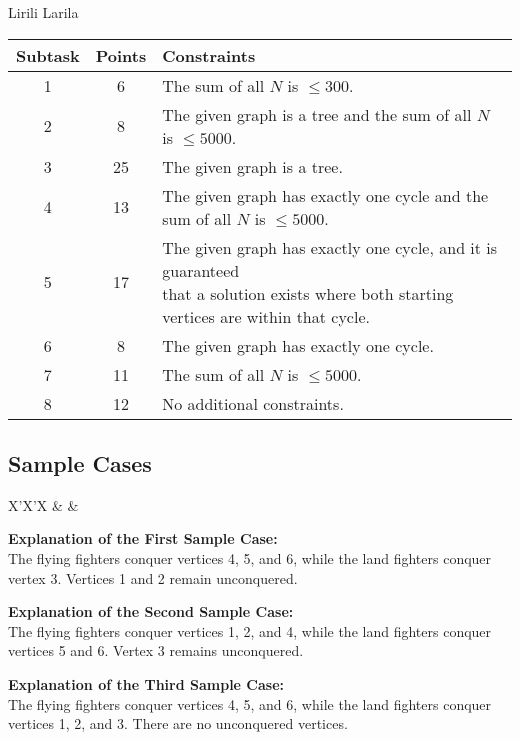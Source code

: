 \begin{statement}[
  problempoints=100,
  timelimit=2 seconds,
  memorylimit=512 MiB,
]{Lirili Larila}
{\renewcommand{\arraystretch}{1.4}
  \setlength{\tabcolsep}{6pt}
  \begin{tabular}{ccl}
   Subtask & Points & Constraints \\ \midrule
    1 & 6 & The sum of all $N$ is $\leq 300$. \\
    2 & 8 & The given graph is a tree and the sum of all $N$ is $\leq 5000$. \\
    3 & 25 & The given graph is a tree. \\
    4 & 13 & The given graph has exactly one cycle and the sum of all $N$ is $\leq 5000$. \\[5pt]
    5 & 17 & \makecell[l]{The given graph has exactly one cycle, and it is guaranteed \\ that a solution exists where both starting vertices are within that cycle.} \\[6pt]
    6 & 8 & The given graph has exactly one cycle. \\
    7 & 11 & The sum of all $N$ is $\leq 5000$. \\
    8 & 12 & No additional constraints. \\
\end{tabular}}

\subsection*{Sample Cases}
\begin{tabularx}{\textwidth}{X'X'X}
 &
 &
\end{tabularx}

\textbf{Explanation of the First Sample Case:} \\
The flying fighters conquer vertices 4, 5, and 6, while the land fighters conquer vertex 3.  
Vertices 1 and 2 remain unconquered.

\textbf{Explanation of the Second Sample Case:} \\
The flying fighters conquer vertices 1, 2, and 4, while the land fighters conquer vertices 5 and 6.  
Vertex 3 remains unconquered.

\textbf{Explanation of the Third Sample Case:} \\
The flying fighters conquer vertices 4, 5, and 6, while the land fighters conquer vertices 1, 2, and 3.  
There are no unconquered vertices.

\end{statement}
